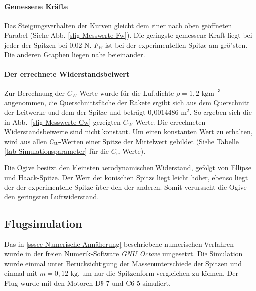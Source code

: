 \documentclass[10pt,a4paper]{article}
\begin{document}
\paragraph{Gemessene Kräfte}
Das Steigungsverhalten der Kurven gleicht dem einer nach oben geöffneten Parabel (Siehe Abb. \ref{sfig-Messwerte-Fw}). Die geringste gemessene Kraft liegt bei jeder der Spitzen bei 0,02 N. $F_{W}$ ist bei der experimentellen Spitze am grö"sten. Die anderen Graphen liegen nahe beieinander.

\paragraph{Der errechnete Widerstandsbeiwert}
Zur Berechnung der $C_{W}$-Werte wurde für die Luftdichte ${\rho} = 1,2 \text{ kgm}^{-3}$ angenommen, die Querschnittsfläche der Rakete ergibt sich aus dem Querschnitt der Leitwerke und dem der Spitze und beträgt $ 0,0014486 \text{ m}^{2} $. So ergeben sich die in Abb.~\ref{sfig-Messwerte-Cw} gezeigten $C_{W}$-Werte.
Die errechneten Widerstandsbeiwerte sind nicht konstant. Um einen konstanten Wert zu erhalten, wird aus allen $C_{W}$-Werten einer Spitze der Mittelwert gebildet (Siehe Tabelle \ref{tab-Simulationsparameter} für die $C_{w}$-Werte).

Die Ogive besitzt den kleinsten aerodynamischen Widerstand, gefolgt von Ellipse und Haack-Spitze. Der Wert der konischen Spitze liegt leicht höher, ebenso liegt der der experimentelle Spitze über den der anderen. Somit verursacht die Ogive den geringsten Luftwiderstand. 


\subsection{Flugsimulation}

Das in \ref{sssec-Numerische-Annäherung} beschriebene numerischen Verfahren wurde in der freien Numerik-Software \emph{GNU Octave} umgesetzt. Die Simulation wurde einmal unter Berücksichtigung der Massenunterschiede der Spitzen und einmal mit $m = 0,12 \text{ kg}$, um nur die Spitzenform vergleichen zu können. Der Flug wurde mit den Motoren \textsf{D9-7} und \textsf{C6-5} simuliert.
\end{document}
